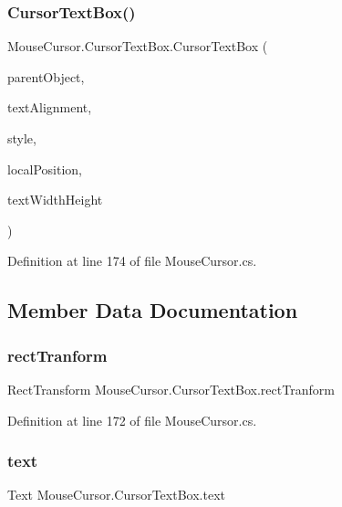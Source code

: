 \subsubsection{\texorpdfstring{Cursor\+Text\+Box()}{CursorTextBox()}}
{\footnotesize\ttfamily Mouse\+Cursor.\+Cursor\+Text\+Box.\+Cursor\+Text\+Box (\begin{DoxyParamCaption}\item[{Game\+Object}]{parent\+Object,  }\item[{Text\+Anchor}]{text\+Alignment,  }\item[{G\+U\+I\+Style}]{style,  }\item[{Vector3}]{local\+Position,  }\item[{Vector2}]{text\+Width\+Height }\end{DoxyParamCaption})}



Definition at line 174 of file Mouse\+Cursor.\+cs.



\subsection{Member Data Documentation}
\mbox{\label{class_mouse_cursor_1_1_cursor_text_box_a372999a43870de2f0a09f66390893857}} 
\subsubsection{\texorpdfstring{rect\+Tranform}{rectTranform}}
{\footnotesize\ttfamily Rect\+Transform Mouse\+Cursor.\+Cursor\+Text\+Box.\+rect\+Tranform}



Definition at line 172 of file Mouse\+Cursor.\+cs.

\mbox{\label{class_mouse_cursor_1_1_cursor_text_box_aa5f80888f3b5655e9ac3b09fdb631d84}} 
\subsubsection{\texorpdfstring{text}{text}}
{\footnotesize\ttfamily Text Mouse\+Cursor.\+Cursor\+Text\+Box.\+text}



